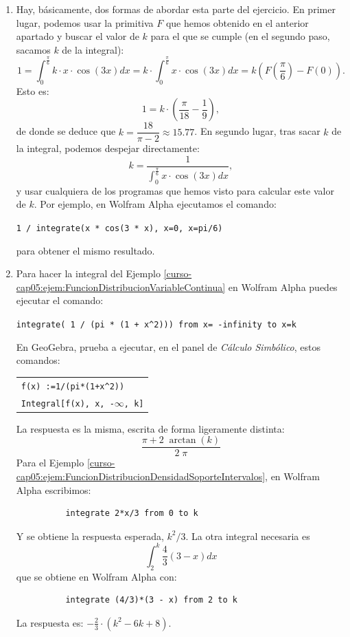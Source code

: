 \documentclass[10pt,a4paper]{article}\usepackage[]{graphicx}\usepackage[]{color}
\begin{document}
\begin{enumerate}
  \item  Hay, básicamente, dos formas de abordar esta parte del ejercicio. En primer lugar, podemos usar la primitiva $F$ que hemos obtenido en el anterior apartado y buscar el valor de $k$ para el que se cumple (en el segundo paso, sacamos $k$ de la integral):
      \[1 = \int_0^{\frac{\pi}{6}} k\cdot x\cdot\cos(3x)dx =
      k \cdot \int_0^{\frac{\pi}{6}} x\cdot\cos(3x)dx = k \left(F(\frac{\pi}{6}) - F(0)\right).\]
      Esto es:
      \[1 = k\cdot\left(\dfrac{\pi}{18} - \frac{1}{9}\right),\]
      de donde se deduce que $k=\dfrac{18}{\pi - 2}\approx 15.77$. En segundo lugar, tras sacar $k$ de la integral, podemos despejar directamente:
      \[k = \dfrac{1}{\int_0^{\frac{\pi}{6}} x\cdot\cos(3x)dx},\]
      y usar cualquiera de los programas que hemos visto para calcular este valor de $k$. Por ejemplo, en Wolfram Alpha ejecutamos el comando:
      \begin{center}
        {\tt 1 / integrate(x * cos(3 * x), x=0, x=pi/6)}
      \end{center}
      para obtener el mismo resultado.
  \item Para hacer la integral del Ejemplo \ref{curso-cap05:ejem:FuncionDistribucionVariableContinua} en Wolfram Alpha puedes ejecutar el comando:
      \begin{center}
        \verb#integrate( 1 / (pi * (1 + x^2))) from x= -infinity to x=k#
      \end{center}
      En GeoGebra, prueba a ejecutar, en el panel de {\em Cálculo Simbólico}, estos comandos:
      \begin{center}
        \begin{tabular}{l}
           {\verb#f(x) :=1/(pi*(1+x^2))#}\\
           {\tt Integral[f(x), x, -}$\infty${\tt, k]}
        \end{tabular}
      \end{center}
      La respuesta es la misma, escrita de forma ligeramente distinta:
      \[{\frac{\pi + 2 \; \operatorname{arctan} \left( k \right)}{2 \; \pi}}\]
      Para el Ejemplo \ref{curso-cap05:ejem:FuncionDistribucionDensidadSoporteIntervalos}, en Wolfram Alpha escribimos:
      \begin{center}
        \begin{verbatim}
          integrate 2*x/3 from 0 to k
        \end{verbatim}
      \end{center}
      Y se obtiene la respuesta esperada, $k^2/3$. La otra integral necesaria es
      \[\int_2^k \dfrac{4}{3}(3 - x)dx\]
      que se obtiene en Wolfram Alpha con:
      \begin{center}
        \begin{verbatim}
          integrate (4/3)*(3 - x) from 2 to k
        \end{verbatim}
      \end{center}
      La respuesta es: $-\frac{2}{3}\cdot(k^2-6 k+8)$.


\end{enumerate}
\end{document}
